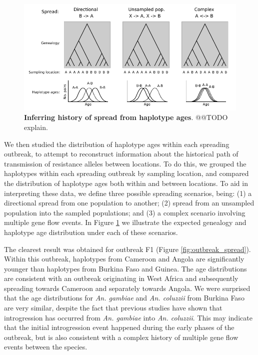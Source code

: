 \documentclass[a4paper,11pt,abstracton]{scrartcl}
\begin{document}
%
\begin{figure}[!b]
  \includegraphics[width=1.1\linewidth,center]{artwork/spreading.pdf}
  \caption{\textbf{Inferring history of spread from haplotype ages}. @@TODO explain.}
  \label{fig:spreading_cartoon}
\end{figure}


%
We then studied the distribution of haplotype ages within each spreading outbreak, to attempt to reconstruct information about the historical path of transmission of resistance alleles between locations.
%
To do this, we grouped the haplotypes within each spreading outbreak by sampling location, and compared the distribution of haplotype ages both within and between locations.
%
To aid in interpreting these data, we define three possible spreading scenarios, being: (1) a directional spread from one population to another; (2) spread from an unsampled population into the sampled populations; and (3) a complex scenario involving multiple gene flow events.
%
In Figure \ref{fig:spreading_cartoon} we illustrate the expected genealogy and haplotype age distribution under each of these scenarios.
%


%
The clearest result was obtained for outbreak F1 (Figure \ref{fig:outbreak_spread}).
%
Within this outbreak, haplotypes from Cameroon and Angola are significantly younger than haplotypes from Burkina Faso and Guinea.
%
The age distributions are consistent with an outbreak originating in West Africa and subsequently spreading towards Cameroon and separately towards Angola.
%
We were surprised that the age distributions for \textit{An. gambiae} and \textit{An. coluzzii} from Burkina Faso are very similar, despite the fact that previous studies have shown that introgression has occurred from \textit{An. gambiae} into \textit{An. coluzzii}.
%
This may indicate that the initial introgression event happened during the early phases of the outbreak, but is also consistent with a complex history of multiple gene flow events between the species.
\end{document}
